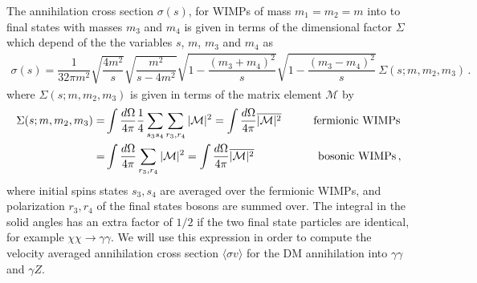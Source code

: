 The annihilation cross section $\sigma (s) $, for WIMPs of mass $m_1=m_2=m$ into to final states with masses $m_3$ and $m_4$ is given in terms of the dimensional factor $\Sigma$ which depend of the the variables $s$, $m$, $m_3$ and $m_4$ as~\cite{Chen:2013gya}
%
\begin{align}
\label{eq:cs-2to2}
\sigma(s)=\dfrac{1}{32\pi m^2}\sqrt{\dfrac{4m^2}{s}}\sqrt{\dfrac{m^2}{s-4m^2}}\sqrt{1-\dfrac{(m_3+m_4)^2}{s}}\sqrt{1-\dfrac{(m_3-m_4)^2}{s}}\,
\Sigma(s;m,m_2,m_3)\,.
\end{align} 
%
where $\Sigma(s;m,m_2,m_3)$ is given in terms of the matrix element $\mathcal{M}$ by
%
\begin{align}
\Sigma(s;m,m_2,m_3)
= & \int \dfrac{d\Omega}{4\pi}\dfrac{1}{4}\sum_{s_3s_4}\sum_{r_3,r_4}|\mathcal{M}|^2
=   \int \dfrac{d\Omega}{4\pi}\overline{|\mathcal{M}|^2}  \hspace{1.0 cm} \text{fermionic WIMPs}\\
= & \int \dfrac{d\Omega}{4\pi}\sum_{r_3,r_4}|\mathcal{M}|^2 
=   \int \dfrac{d\Omega}{4\pi}\overline{|\mathcal{M}|^2} \hspace{2.0 cm} \text{bosonic WIMPs}\,,
\end{align}
%
where initial spins states $s_3 , s_4$ are averaged over the fermionic WIMPs, and polarization $r_3 , r_4$ of the final states bosons are summed over. The integral in the solid angles has an extra factor of $1/2$ if the two final state particles are identical, for example $\chi\chi\to\gamma\gamma$.  
%
We will use this expression in order to compute the velocity averaged annihilation cross section $\langle \sigma v \rangle$ for the DM annihilation into $\gamma\gamma$ and $\gamma Z$. 

